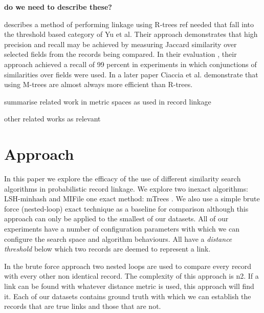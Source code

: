 \documentclass{llncs}
\begin{document}
{\textbf{do we need to describe these?}}

 \cite{Li2006} describes a method of performing linkage using R-trees {ref needed} that fall into the threshold based category of Yu et al. Their approach demonstrates that high precision and recall may be achieved by measuring Jaccard similarity over selected fields from the records being compared. In their evaluation , their approach achieved a recall of 99 percent in experiments in which conjunctions of similarities over fields were used. In a later paper \cite{Ciaccia97indexingmetric}  Ciaccia et al. demonstrate that using M-trees are almost always more efficient than R-trees.

summarise related work in metric spaces as used in record linkage

other related works as relevant


\section{Approach}
\label{sec-approach}

In this paper we explore the efficacy of the use of different similarity search algorithms in probabilistic record linkage. We explore two inexact algorithms: LSH-minhash and MIFile \cite{amato2014mi} one exact method: mTrees \cite{paolociaccia2m}. We also use a simple brute force (nested-loop) exact technique as a baseline for comparison although this approach can only be applied to the smallest of our datasets. All of our experiments have a number of configuration parameters with which we can configure the search space and algorithm behaviours. All have a \textit{distance threshold} below which two records are deemed to represent a link.

In the brute force approach two nested loops are used to compare every record with every other non identical record. The complexity of this approach is n2. If a link can be found with whatever distance metric is used, this approach will find it. Each of our datasets contains ground truth with which we can establish the records that are true links and those that are not. 
\end{document}
